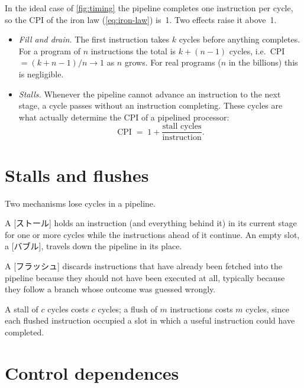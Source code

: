 \documentclass[../main.tex]{subfiles}
\begin{document}
In the ideal case of \cref{fig:timing} the pipeline completes one
instruction per cycle, so the CPI of the iron law
(\cref{eq:iron-law}) is~1.  Two
effects raise it above~1.
\begin{itemize}
  \item \emph{Fill and drain.}  The first instruction takes $k$ cycles
    before anything completes.  For a program of $n$ instructions the total
    is $k + (n-1)$ cycles, i.e.\ CPI $= (k+n-1)/n \to 1$ as $n$ grows.  For
    real programs ($n$ in the billions) this is negligible.
  \item \emph{Stalls.}  Whenever the pipeline cannot advance an instruction
    to the next stage, a cycle passes without an instruction completing.
    These cycles are what actually determine the CPI of a pipelined
    processor:
    \begin{equation}
      \text{CPI} \;=\; 1 + \frac{\text{stall cycles}}{\text{instruction}} .
      \label{eq:pipeline-cpi}
    \end{equation}
\end{itemize}

\section{Stalls and flushes}

Two mechanisms lose cycles in a pipeline.

\begin{definition}[Stall]
  A [ストール] holds an instruction (and everything behind it)
  in its current stage for one or more cycles while the instructions ahead
  of it continue.  An empty slot, a [バブル], travels down
  the pipeline in its place.
\end{definition}

\begin{definition}[Flush]
  A [フラッシュ] discards instructions that have already been
  fetched into the pipeline because they should not have been executed at
  all, typically because they follow a branch whose outcome was guessed
  wrongly.
\end{definition}

A stall of $c$ cycles costs $c$ cycles; a flush of $m$ instructions costs
$m$ cycles, since each flushed instruction occupied a slot in which a useful
instruction could have completed.

\section{Control dependences}
\end{document}
